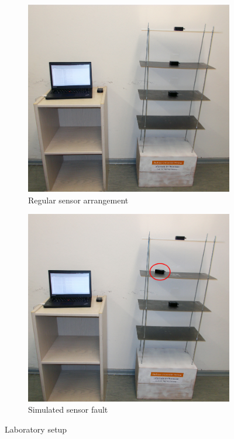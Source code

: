 \documentclass[12pt,a4paper]{scrartcl}
\begin{document}
\begin{figure}[htb]

	\centering
	
	\begin{subfigure}{0.48\textwidth}
		\includegraphics[width=\textwidth]{figures/testsetupcorrect.jpg}
    	\caption{Regular sensor arrangement}
		\label{fig:teststructure}
    \end{subfigure}
    \quad
  	\begin{subfigure}{0.48\textwidth}
		\includegraphics[width=\textwidth]{figures/testsetuperror.jpg}
    	\caption{Simulated sensor fault}
        \label{fig:sensorfault}
	\end{subfigure}
  	\caption{Laboratory setup}
\end{figure}
\end{document}
